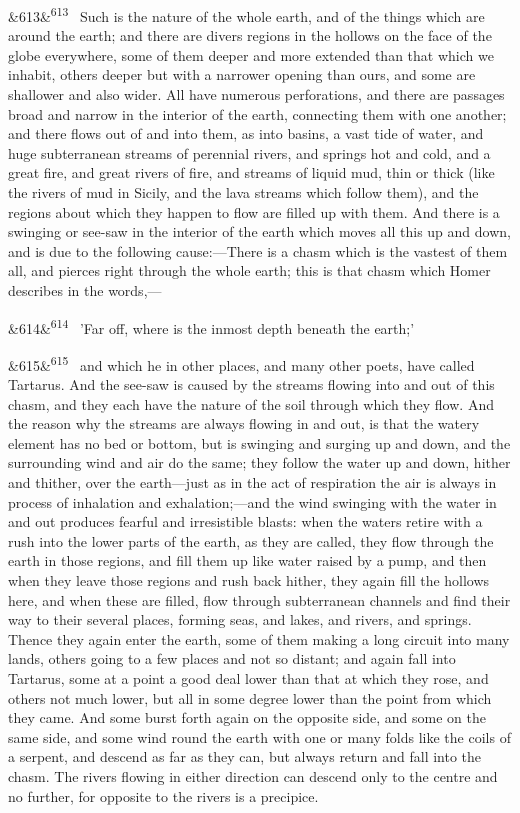\documentclass[12pt]{article}
\newcommand{\para}[1][]{\par\noindent\ifx&#1&\else\textsuperscript{\footnotesize #1}~\fi}
\begin{document}
\para[613] Such is the nature of the whole earth, and of the things which are around the earth; and there are divers regions in the hollows on the face of the globe everywhere, some of them deeper and more extended than that which we inhabit, others deeper but with a narrower opening than ours, and some are shallower and also wider. All have numerous perforations, and there are passages broad and narrow in the interior of the earth, connecting them with one another; and there flows out of and into them, as into basins, a vast tide of water, and huge subterranean streams of perennial rivers, and springs hot and cold, and a great fire, and great rivers of fire, and streams of liquid mud, thin or thick (like the rivers of mud in Sicily, and the lava streams which follow them), and the regions about which they happen to flow are filled up with them. And there is a swinging or see-saw in the interior of the earth which moves all this up and down, and is due to the following cause:---There is a chasm which is the vastest of them all, and pierces right through the whole earth; this is that chasm which Homer describes in the words,---

\para[614] 'Far off, where is the inmost depth beneath the earth;'

\para[615] and which he in other places, and many other poets, have called Tartarus. And the see-saw is caused by the streams flowing into and out of this chasm, and they each have the nature of the soil through which they flow. And the reason why the streams are always flowing in and out, is that the watery element has no bed or bottom, but is swinging and surging up and down, and the surrounding wind and air do the same; they follow the water up and down, hither and thither, over the earth---just as in the act of respiration the air is always in process of inhalation and exhalation;---and the wind swinging with the water in and out produces fearful and irresistible blasts: when the waters retire with a rush into the lower parts of the earth, as they are called, they flow through the earth in those regions, and fill them up like water raised by a pump, and then when they leave those regions and rush back hither, they again fill the hollows here, and when these are filled, flow through subterranean channels and find their way to their several places, forming seas, and lakes, and rivers, and springs. Thence they again enter the earth, some of them making a long circuit into many lands, others going to a few places and not so distant; and again fall into Tartarus, some at a point a good deal lower than that at which they rose, and others not much lower, but all in some degree lower than the point from which they came. And some burst forth again on the opposite side, and some on the same side, and some wind round the earth with one or many folds like the coils of a serpent, and descend as far as they can, but always return and fall into the chasm. The rivers flowing in either direction can descend only to the centre and no further, for opposite to the rivers is a precipice.
\end{document}
